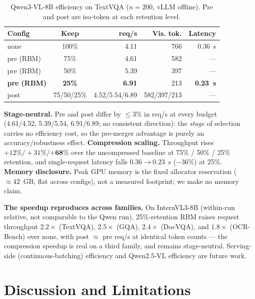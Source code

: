 \documentclass[sigconf,review,anonymous]{acmart}
\begin{document}
\begin{table}[t]
  \centering
  \footnotesize
  \setlength{\tabcolsep}{3pt}
  \caption{Qwen3-VL-8B efficiency on TextVQA ($n=200$, vLLM offline). Pre and
    post are iso-token at each retention level.}
  \label{tab:tab5}
  \begin{tabular}{@{}l c r r r@{}}
    \toprule
    Config & Keep & req/s & Vis. tok. & Latency \\
    \midrule
    none             & 100\%       & 4.11 & 766         & 0.36~s \\
    pre (RBM)        & 75\%        & 4.61 & 582         & --- \\
    pre (RBM)        & 50\%        & 5.39 & 397         & --- \\
    \textbf{pre (RBM)} & \textbf{25\%} & \textbf{6.91} & 213 & \textbf{0.23~s} \\
    post             & 75/50/25\%  & 4.52/5.54/6.89 & 582/397/213 & --- \\
    \bottomrule
  \end{tabular}
\end{table}

\textbf{Stage-neutral.} Pre and post differ by $\leq 3\%$ in req/s at every
budget (4.61/4.52, 5.39/5.54, 6.91/6.89; no consistent direction): the
\emph{stage} of selection carries no efficiency cost, so the pre-merger
advantage is purely an accuracy/robustness effect. \textbf{Compression scaling.}
Throughput rises $+12\% / +31\% / \mathbf{+68\%}$ over the uncompressed baseline
at 75\% / 50\% / 25\% retention, and single-request latency falls
$0.36 \to 0.23$~s ($-36\%$) at 25\%. \textbf{Memory disclosure.} Peak GPU memory
is the fixed allocator reservation ($\approx 42$~GB, flat across configs), not a
measured footprint; we make no memory claim.

\textbf{The speedup reproduces across families.} On InternVL3-8B (within-run
relative, not comparable to the Qwen run), 25\%-retention RBM raises request
throughput $2.2\times$ (TextVQA), $2.5\times$ (GQA), $2.4\times$ (DocVQA), and
$1.8\times$ (OCR-Bench) over none, with post $\approx$ pre req/s at identical
token counts --- the compression speedup is real on a third family, and remains
stage-neutral. Serving-side (continuous-batching) efficiency and Qwen2.5-VL
efficiency are future work.

\section{Discussion and Limitations}\label{sec:discussion}
\end{document}
